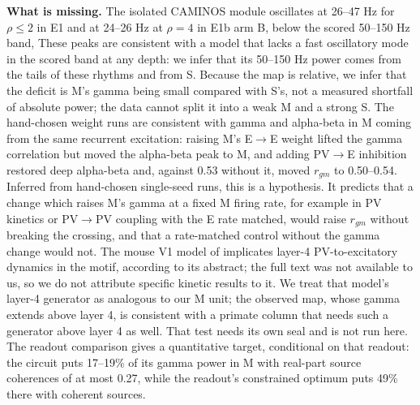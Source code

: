 \textbf{What is missing.} The isolated CAMINOS module oscillates at 26--47 Hz for $\rho \leq 2$ in E1 and at 24--26 Hz at $\rho = 4$ in E1b arm B, below the scored 50--150 Hz band,
These peaks are consistent with a model that lacks a fast
oscillatory mode in the scored band at any depth: we infer that its 50--150 Hz power comes from the tails of
these rhythms and from S. Because the map is relative, we infer that the deficit is M's gamma being small compared with S's, not
a measured shortfall of absolute power; the data cannot split it into a weak M and a strong S. The hand-chosen weight runs are
consistent with gamma and alpha-beta in M coming from the same recurrent excitation: raising M's E$\to$E weight lifted the
gamma correlation but moved the alpha-beta peak to M, and adding PV$\to$E inhibition restored deep alpha-beta and, against 0.53 without it, moved $r_{gm}$ to 0.50--0.54. Inferred from hand-chosen single-seed runs, this is a hypothesis. It predicts that a change
which raises M's gamma at a fixed M firing rate, for example in PV kinetics or PV$\to$PV coupling with the E rate
matched, would raise $r_{gm}$ without breaking the crossing, and that a rate-matched control without the gamma
change would not. The mouse V1 model of \citet{Herrera2026} implicates layer-4 PV-to-excitatory dynamics in the
motif, according to its abstract; the full text was not available to us, so we do not attribute specific kinetic
results to it. We treat that model's layer-4 generator as analogous to
our M unit; the observed map, whose gamma extends above layer 4, is consistent with a primate column that needs
such a generator above layer 4 as well. That test needs its own seal and is not run here. The readout comparison gives a quantitative target, conditional on that readout: the
circuit puts 17--19\% of its gamma power in M with real-part source coherences of at most 0.27, while the readout's constrained
optimum puts 49\% there with coherent sources.

